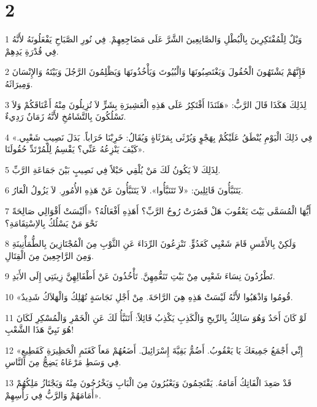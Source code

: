 \chapter{2}

\par 1 وَيْلٌ لِلْمُفْتَكِرِينَ بِالْبُطْلِ وَالصَّانِعِينَ الشَّرَّ عَلَى مَضَاجِعِهِمْ. فِي نُورِ الصَّبَاحِ يَفْعَلُونَهُ لأَنَّهُ فِي قُدْرَةِ يَدِهِمْ.
\par 2 فَإِنَّهُمْ يَشْتَهُونَ الْحُقُولَ وَيَغْتَصِبُونَهَا وَالْبُيُوتَ وَيَأْخُذُونَهَا وَيَظْلِمُونَ الرَّجُلَ وَبَيْتَهُ وَالإِنْسَانَ وَمِيرَاثَهُ.
\par 3 لِذَلِكَ هَكَذَا قَالَ الرَّبُّ: «هَئَنَذَا أَفْتَكِرُ عَلَى هَذِهِ الْعَشِيرَةِ بِشَرٍّ لاَ تُزِيلُونَ مِنْهُ أَعْنَاقَكُمْ وَلاَ تَسْلُكُونَ بِالتَّشَامُخِ لأَنَّهُ زَمَانٌ رَدِيءٌ.
\par 4 «فِي ذَلِكَ الْيَوْمِ يُنْطَقُ عَلَيْكُمْ بِهَجْوٍ وَيُرْثَى بِمَرْثَاةٍ وَيُقَالُ: خَرِبْنَا خَرَاباً. بَدَلَ نَصِيبِ شَعْبِي. كَيْفَ يَنْزِعُهُ عَنِّي؟ يَقْسِمُ لِلْمُرْتَدِّ حُقُولَنَا».
\par 5 لِذَلِكَ لاَ يَكُونُ لَكَ مَنْ يُلْقِي حَبْلاً فِي نَصِيبٍ بَيْنَ جَمَاعَةِ الرَّبِّ.
\par 6 يَتَنَبَّأُونَ قَائِلِينَ: «لاَ تَتَنَبَّأُوا». لاَ يَتَنَبَّأُونَ عَنْ هَذِهِ الأُمُورِ. لاَ يَزُولُ الْعَارُ.
\par 7 أَيُّهَا الْمُسَمَّى بَيْتَ يَعْقُوبَ هَلْ قَصُرَتْ رُوحُ الرَّبِّ؟ أَهَذِهِ أَفْعَالُهُ؟ «أَلَيْسَتْ أَقْوَالِي صَالِحَةً نَحْوَ مَنْ يَسْلُكُ بِالاِسْتِقَامَةِ؟
\par 8 وَلَكِنْ بِالأَمْسِ قَامَ شَعْبِي كَعَدُوٍّ. تَنْزِعُونَ الرِّدَاءَ عَنِ الثَّوْبِ مِنَ الْمُجْتَازِينَ بِالطُّمَأْنِينَةِ وَمِنَ الرَّاجِعِينَ مِنَ الْقِتَالِ.
\par 9 تَطْرُدُونَ نِسَاءَ شَعْبِي مِنْ بَيْتِ تَنَعُّمِهِنَّ. تَأْخُذُونَ عَنْ أَطْفَالِهِنَّ زِينَتِي إِلَى الأَبَدِ.
\par 10 «قُومُوا وَاذْهَبُوا لأَنَّهُ لَيْسَتْ هَذِهِ هِيَ الرَّاحَةَ. مِنْ أَجْلِ نَجَاسَةٍ تُهْلِكُ وَالْهَلاَكُ شَدِيدٌ.
\par 11 لَوْ كَانَ أَحَدٌ وَهُوَ سَالِكٌ بِالرِّيحِ وَالْكَذِبِ يَكْذِبُ قَائِلاً: أَتَنَبَّأُ لَكَ عَنِ الْخَمْرِ وَالْمُسْكِرِ لَكَانَ هُوَ نَبِيَّ هَذَا الشَّعْبِ!
\par 12 «إِنِّي أَجْمَعُ جَمِيعَكَ يَا يَعْقُوبُ. أَضُمُّ بَقِيَّةَ إِسْرَائِيلَ. أَضَعُهُمْ مَعاً كَغَنَمِ الْحَظِيرَةِ كَقَطِيعٍ فِي وَسَطِ مَرْعَاهُ يَضِجُّ مِنَ النَّاسِ.
\par 13 قَدْ صَعِدَ الْفَاتِكُ أَمَامَهُ. يَقْتَحِمُونَ وَيَعْبُرُونَ مِنَ الْبَابِ وَيَخْرُجُونَ مِنْهُ وَيَجْتَازُ مَلِكُهُمْ أَمَامَهُمْ وَالرَّبُّ فِي رَأْسِهِمْ».

